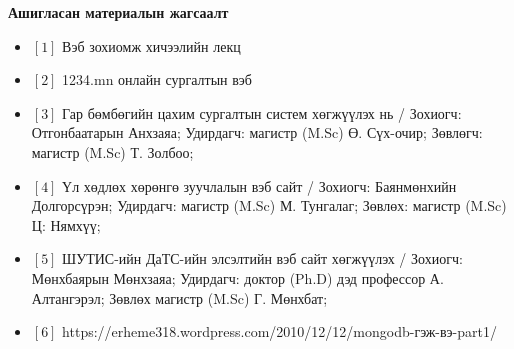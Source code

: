 \begin{center}
    \textbf{Ашигласан материалын жагсаалт}
\end{center}

\begin{itemize}
    \item []$[1]$ Вэб зохиомж хичээлийн лекц
    \item []$[2]$ 1234.mn онлайн сургалтын вэб
    \item []$[3]$ Гар бөмбөгийн цахим сургалтын систем хөгжүүлэх нь / Зохиогч: Отгонбаатарын Анхзаяа; Удирдагч: магистр (M.Sc) Ө. Сүх-очир; Зөвлөгч: магистр (M.Sc) Т. Золбоо;
    \item []$[4]$ Үл хөдлөх хөрөнгө зуучлалын вэб сайт / Зохиогч: Баянмөнхийн Долгорсүрэн; Удирдагч: магистр (M.Sc) М. Тунгалаг; Зөвлөх: магистр (M.Sc) Ц: Нямхүү;
    \item []$[5]$ ШУТИС-ийн ДаТС-ийн элсэлтийн вэб сайт хөгжүүлэх / Зохиогч: Мөнхбаярын Мөнхзаяа; Удирдагч: доктор (Ph.D) дэд профессор А. Алтангэрэл; Зөвлөх магистр (M.Sc) Г. Мөнхбат;
    \item []$[6]$ https://erheme318.wordpress.com/2010/12/12/mongodb-гэж-вэ-part1/
\end{itemize}